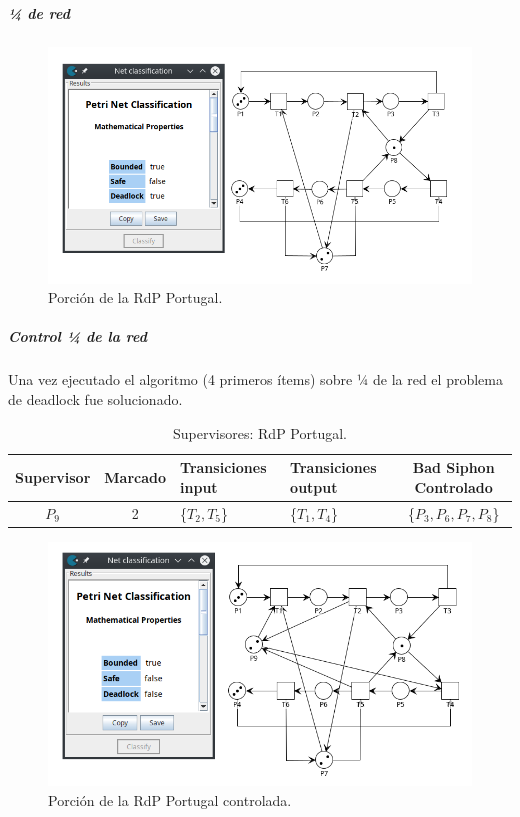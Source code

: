 \subparagraph{¼ de red}
\hfill

\begin{figure}[H]
	\centering
	\includegraphics[scale=0.6]{Figures/algoritmo3/Portugal2.png}
	\caption{Porción de la RdP Portugal.}
	\label{fig:cuartodered_portugal}
 \end{figure}
\subparagraph{Control ¼ de la red}
\hfill \break
Una vez ejecutado el algoritmo (4 primeros ítems) sobre ¼ de la red el problema de deadlock fue solucionado.

\begin{table}[H]
    \centering
    \begin{tabular}{|c|c|P{2.2cm}|P{2.2cm}|c|}
    \hline
    \textbf{Supervisor} & \textbf{Marcado} & \textbf{Transiciones input} & \textbf{Transiciones output} & \textbf{Bad Siphon Controlado}  \\  \hline
    $P_{9}$ & 2 & \{$T_{2}, T_{5}$\} & \{$T_{1}, T_{4}$\} & \{$P_3, P_{6}, P_{7}, P_{8}$\} \\ 
    \hline
    \end{tabular}
    \caption{Supervisores: RdP Portugal.}
    \label{tab:Portugal-v3}
\end{table}

\begin{figure}[H]
	\centering
	\includegraphics[scale=0.55]{Figures/algoritmo3/Portugal3.png}
	\caption{Porción de la RdP Portugal controlada.}
	\label{fig:cuartodered_portugalcontrolada}
 \end{figure}

